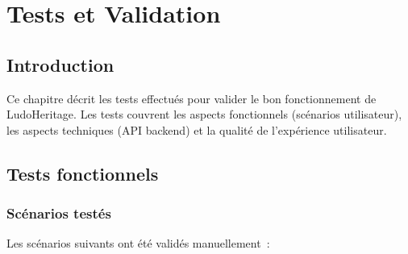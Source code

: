 \chapter{Tests et Validation}

\section{Introduction}

Ce chapitre décrit les tests effectués pour valider le bon fonctionnement de LudoHeritage.
Les tests couvrent les aspects fonctionnels (scénarios utilisateur), les aspects techniques
(API backend) et la qualité de l'expérience utilisateur.

\section{Tests fonctionnels}

\subsection{Scénarios testés}

Les scénarios suivants ont été validés manuellement~:

